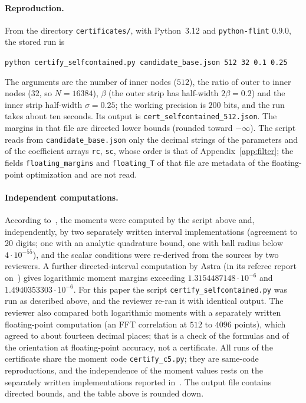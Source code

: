 \documentclass[11pt]{article}
\theoremstyle{definition}
\begin{document}
\paragraph{Reproduction.} From the directory \texttt{certificates/}, with Python~3.12 and \texttt{python-flint}
0.9.0, the stored run is
\begin{center}
\texttt{python certify\_selfcontained.py candidate\_base.json 512 32 0.1 0.25}
\end{center}
The arguments are the number of inner nodes ($512$), the ratio of outer to inner nodes ($32$, so $N=16384$),
$\beta$ (the outer strip has half-width $2\beta=0.2$) and the inner strip half-width $\sigma=0.25$; the working
precision is $200$ bits, and the run takes about ten seconds. Its output is \texttt{cert\_selfcontained\_512.json}.
The margins in that file are directed lower bounds (rounded toward $-\infty$). The script reads from
\texttt{candidate\_base.json} only the decimal strings of the parameters and of the coefficient arrays
\texttt{rc}, \texttt{sc}, whose order is that of Appendix~\ref{app:filter}; the fields \texttt{floating\_margins}
and \texttt{floating\_T} of that file are metadata of the floating-point optimization and are not read.

\paragraph{Independent computations.} According to~\cite{V}, the moments were computed by the script above and,
independently, by two separately written interval implementations (agreement to 20 digits; one with an analytic
quadrature bound, one with ball radius below $4\cdot10^{-55}$), and the scalar conditions were re-derived from the
sources by two reviewers. A further directed-interval computation by Astra (in its referee
report on~\cite{V}) gives logarithmic moment margins exceeding $1.3154487148\cdot10^{-6}$ and $1.4940353303\cdot10^{-6}$. For
this paper the script \texttt{certify\_selfcontained.py} was run as described above, and the reviewer re-ran it with
identical output. The reviewer also compared both logarithmic moments with a separately written floating-point
computation (an FFT correlation at $512$ to $4096$ points), which agreed to about fourteen decimal places; that
is a check of the formulas and of the orientation at floating-point accuracy, not a certificate.
All runs of the certificate share the moment code \texttt{certify\_c5.py}; they are same-code reproductions, and
the independence of the moment values rests on the separately written implementations reported in~\cite{V}. The
output file contains directed bounds, and the table above is rounded down.
\end{document}
